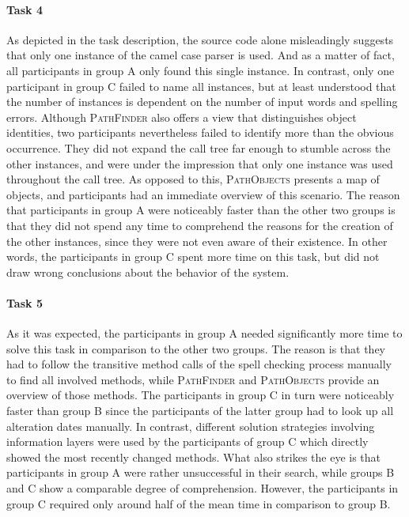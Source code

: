 \paragraph{Task 4} As depicted in the task description, the source code alone misleadingly suggests that only one instance of the camel case parser is used.
And as a matter of fact, all participants in group A only found this single instance.
In contrast, only one participant in group C failed to name all instances, but at least understood that the number of instances is dependent on the number of input words and spelling errors.
Although \textsc{PathFinder} also offers a view that distinguishes object identities, two participants nevertheless failed to identify more than the obvious occurrence.
They did not expand the call tree far enough to stumble across the other instances, and were under the impression that only one instance was used throughout the call tree.
As opposed to this, \textsc{PathObjects} presents a map of objects, and participants had an immediate overview of this scenario.
The reason that participants in group A were noticeably faster than the other two groups is that they did not spend any time to comprehend the reasons for the creation of the other instances, since they were not even aware of their existence.
In other words, the participants in group C spent more time on this task, but did not draw wrong conclusions about the behavior of the system.

\paragraph{Task 5} As it was expected, the participants in group A needed significantly more time to solve this task in comparison to the other two groups.
The reason is that they had to follow the transitive method calls of the spell checking process manually to find all involved methods, while \textsc{PathFinder} and \textsc{PathObjects} provide an overview of those methods.
The participants in group C in turn were noticeably faster than group B since the participants of the latter group had to look up all alteration dates manually.
In contrast, different solution strategies involving information layers were used by the participants of group C which directly showed the most recently changed methods.
What also strikes the eye is that participants in group A were rather unsuccessful in their search, while groups B and C show a comparable degree of comprehension.
However, the participants in group C required only around half of the mean time in comparison to group B.

